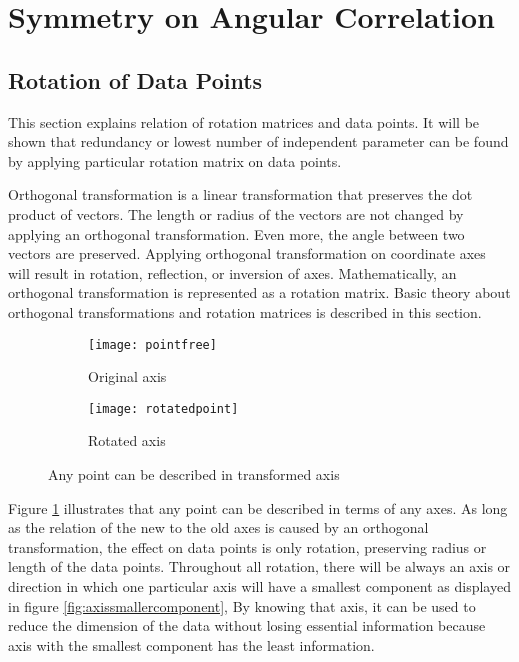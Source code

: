 \section{Symmetry on Angular Correlation}
\subsection{Rotation of Data Points} \label{sec:PCA}
This section explains relation of rotation matrices and data points. It will be shown that redundancy or lowest number of independent parameter can be found by applying particular rotation matrix on data points.

Orthogonal transformation is a linear transformation that preserves the dot product of vectors. The length or radius of the vectors are not changed by applying an orthogonal transformation. Even more, the angle between two vectors are preserved. Applying orthogonal transformation on coordinate axes will result in rotation, reflection, or inversion of axes. Mathematically, an orthogonal transformation is represented as a rotation matrix. Basic theory about orthogonal transformations and rotation matrices is described in this section.   

\begin{figure}[h]
\begin{subfigure}{.5\textwidth}
  \centering
  \texttt{[image: pointfree]}
  \caption{Original axis}
\end{subfigure}
\begin{subfigure}{.5\textwidth}
  \centering
  \texttt{[image: rotatedpoint]}
  \caption{Rotated axis}
\end{subfigure}
\caption{Any point can be described in transformed axis}
\label{fig:rotatedaxis}
\end{figure}

Figure \ref{fig:rotatedaxis} illustrates that any point can be described in terms of any axes. As long as the relation of the new to the old axes is caused by an orthogonal transformation, the effect on data points is only rotation,  preserving radius or length of the data points. Throughout all rotation, there will be always an axis or direction in which one particular axis will have a smallest component as displayed in figure \ref{fig:axissmallercomponent},  By knowing that axis, it can be used to reduce the dimension of the data without losing essential information because axis with the smallest component has the least information.    



